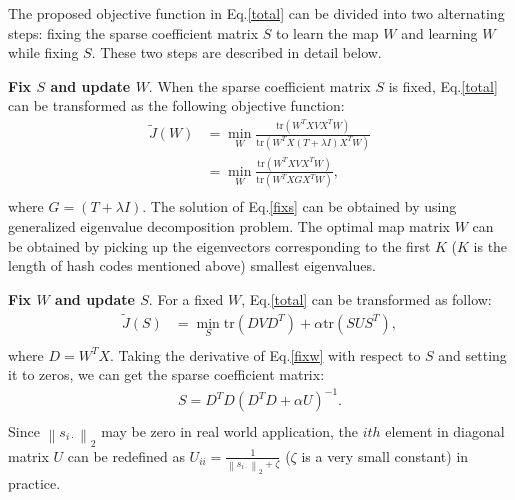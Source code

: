 \documentclass{sig-alternate}
\begin{document}
The proposed objective function in Eq.\ref{total} can be divided into two alternating steps: fixing the sparse coefficient matrix $S$ to learn the map $W$ and learning $W$ while fixing $S$. These two steps are described in detail below.

\textbf {Fix $S$ and update $W$}. When the sparse coefficient matrix $S$ is fixed, Eq.\ref{total} can be transformed as the following objective function:
 \begin{equation}\label{fixs}
    \begin{split}
\tilde{J}(W) & = \min_{W} \frac{\mathrm{tr}\left(W^TXVX^TW\right)}{\mathrm{tr}(W^TX(T+\lambda I)X^TW)}\\
& = \min_{W} \frac{\mathrm{tr}\left(W^TXVX^TW\right)}{\mathrm{tr}(W^TXGX^TW)},\\
    \end{split}
\end{equation}
where $G=(T+\lambda I)$. The solution of Eq.\ref{fixs} can be obtained by using generalized eigenvalue decomposition problem. The optimal map matrix $W$ can be obtained by picking up the eigenvectors corresponding to the first $K$ ($K$ is the length of hash codes mentioned above) smallest eigenvalues.

\textbf {Fix $W$ and update $S$}. For a fixed $W$, Eq.\ref{total} can be transformed as follow:
 \begin{equation}\label{fixw}
    \begin{split}
    \tilde{J}(S) & =\min_{S} \mathrm{tr}\left(DVD^T\right)+\alpha\mathrm{tr}\left(SUS^T\right),\\
    \end{split}
\end{equation}
where $D=W^TX$. Taking the derivative of Eq.\ref{fixw} with respect to $S$ and setting it to zeros, we can get the sparse coefficient matrix:
 \begin{equation}\label{sparses}
    \begin{split}
S=D^TD(D^TD+\alpha U)^{-1}.\\
    \end{split}
\end{equation}
Since $\left \| s_{i\cdot}\right \|_2$ may be zero in real world application, the $ith$ element in diagonal matrix $U$ can be redefined as $U_{ii}=\frac{1}{\left \| s_{i\cdot}\right \|_2+\zeta}$ ($\zeta$ is a very small constant) in practice.
\end{document}
